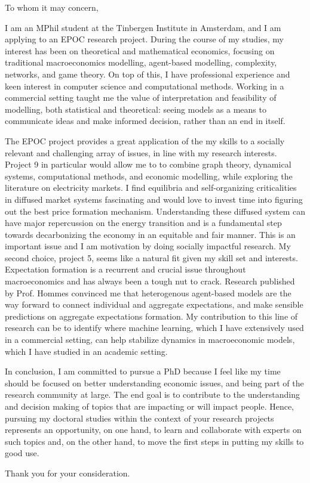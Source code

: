 \documentclass{letter}
\begin{document}
\begin{letter}{}

    \opening{To whom it may concern,}

    I am an MPhil student at the Tinbergen Institute in Amsterdam, and I am applying to an EPOC research project. During the course of my studies, my interest has been on theoretical and mathematical economics, focusing on traditional macroeconomics modelling, agent-based modelling, complexity, networks, and game theory. On top of this, I have professional experience and keen interest in computer science and computational methods. Working in a commercial setting taught me the value of interpretation and feasibility of modelling, both statistical and theoretical: seeing models as a means to communicate ideas and make informed decision, rather than an end in itself.

    The EPOC project provides a great application of the my skills to a socially relevant and challenging array of issues, in line with my research interests. Project 9 in particular would allow me to to combine graph theory, dynamical systems, computational methods, and economic modelling, while exploring the literature on electricity markets. I find equilibria and self-organizing criticalities in diffused market systems fascinating and would love to invest time into figuring out the best price formation mechanism. Understanding these diffused system can have major repercussion on the energy transition and is a fundamental step towards decarbonizing the economy in an equitable and fair manner. This is an important issue and I am motivation by doing socially impactful research. My second choice, project 5, seems like a natural fit given my skill set and interests. Expectation formation is a recurrent and crucial issue throughout macroeconomics and has always been a tough nut to crack. Research published by Prof. Hommes convinced me that heterogenous agent-based models are the way forward to connect individual and aggregate expectations, and make sensible predictions on aggregate expectations formation. My contribution to this line of research can be to identify where machine learning, which I have extensively used in a commercial setting, can help stabilize dynamics in macroeconomic models, which I have studied in an academic setting.

    In conclusion, I am committed to pursue a PhD because I feel like my time should be focused on better understanding economic issues, and being part of the research community at large. The end goal is to contribute to the understanding and decision making of topics that are impacting or will impact people. Hence, pursuing my doctoral studies within the context of your research projects represents an opportunity, on one hand, to learn and collaborate with experts on such topics and, on the other hand, to move the first steps in putting my skills to good use.

    \closing{Thank you for your consideration.}

\end{letter}
\end{document}

